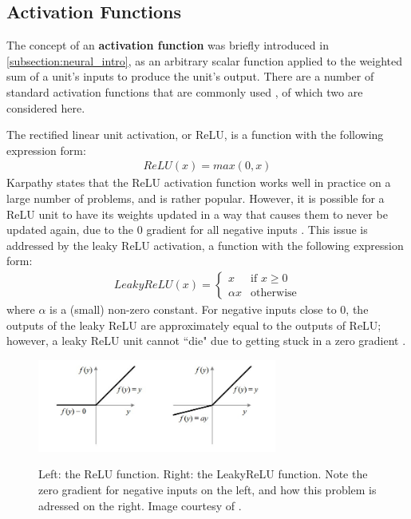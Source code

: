 \documentclass[12pt, titlepage]{report}
\theoremstyle{definition}
\begin{document}
\subsection{Activation Functions}
The concept of an \textbf{activation function} was briefly introduced in \ref{subsection:neural_intro}, as an arbitrary scalar function applied to the weighted sum of a unit's inputs to produce the unit's output. There are a number of standard activation functions that are commonly used \cite[Neural Networks Part 1: Setting up the Architecture]{karpathy2017cs231n}, of which two are considered here.

The rectified linear unit activation, or ReLU, is a function with the following expression form:
\begin{gather}\label{eq:relu}
ReLU(x) = max(0, x)
\end{gather}
Karpathy states that the ReLU activation function works well in practice on a large number of problems, and is rather popular. However, it is possible for a ReLU unit to have its weights updated in a way that causes them to never be updated again, due to the 0 gradient for all negative inputs \cite[Neural Networks Part 1: Setting up the Architecture]{karpathy2017cs231n}. This issue is addressed by the leaky ReLU activation, a function with the following expression form:
\begin{gather}\label{eq:leakyrelu}
LeakyReLU(x) = 
\begin{cases}
    x 							 & \text{if } x\geq 0\\
    \alpha{x}             & \text{otherwise}
\end{cases}
\end{gather}
where $\alpha$ is a (small) non-zero constant. For negative inputs close to 0, the outputs of the leaky ReLU are approximately equal to the outputs of ReLU; however, a leaky ReLU unit cannot ``die" due to getting stuck in a zero gradient \cite[Neural Networks Part 1: Setting up the Architecture]{karpathy2017cs231n}.

\begin{figure}
\centering
\includegraphics[width=0.7\textwidth]{img/relu.jpg}\\
\caption{Left: the ReLU function. Right: the LeakyReLU function. Note the zero gradient for negative inputs on the left, and how this problem is adressed on the right. Image courtesy of \cite{sharma2017activation}.}
\label{figure:relu}
\end{figure}
\end{document}
